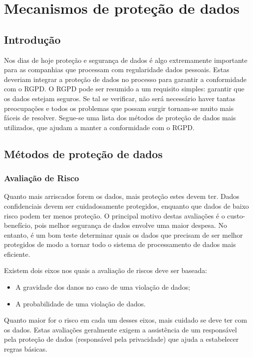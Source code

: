 \chapter{Mecanismos de proteção de dados}
\label{chap5:mecanismos}

\section{Introdução}
\label{chap5:intro}

Nos dias de hoje proteção e segurança de dados é algo extremamente importante para as companhias que processam com regularidade dados pessoais. Estas deveriam integrar a proteção de dados no processo para garantir a conformidade com o \ac{RGPD}.
O \ac{RGPD} pode ser resumido a um requisito simples: garantir que os dados estejam seguros. Se tal se verificar, não será necessário haver tantas preocupações  e todos os problemas que possam surgir tornam-se muito mais fáceis de resolver. Segue-se uma lista dos métodos de proteção de dados mais utilizados, que ajudam a manter a conformidade com o \ac{RGPD}.

\section{Métodos de proteção de dados}
\subsection{Avaliação de Risco}

Quanto mais arriscados forem os dados, mais proteção estes devem ter. Dados confidenciais devem ser cuidadosamente protegidos, enquanto que dados de baixo risco podem ter menos proteção. O principal motivo destas avaliações é o custo-benefício, pois melhor segurança de dados envolve uma maior despesa. No entanto, é um bom teste determinar quais os dados que precisam de ser melhor protegidos de modo a tornar todo o sistema de processamento de dados mais eficiente.

Existem dois eixos nos quais a avaliação de riscos deve ser baseada:
\begin{itemize}
    \item A gravidade dos danos no caso de uma violação de dados;
    \item A probabilidade de uma violação de dados.
\end{itemize}

Quanto maior for o risco em cada um desses eixos, mais cuidado se deve ter com os dados. Estas avaliações geralmente exigem a assistência de um responsável pela proteção de dados (responsável pela privacidade) que ajuda a estabelecer regras básicas.

